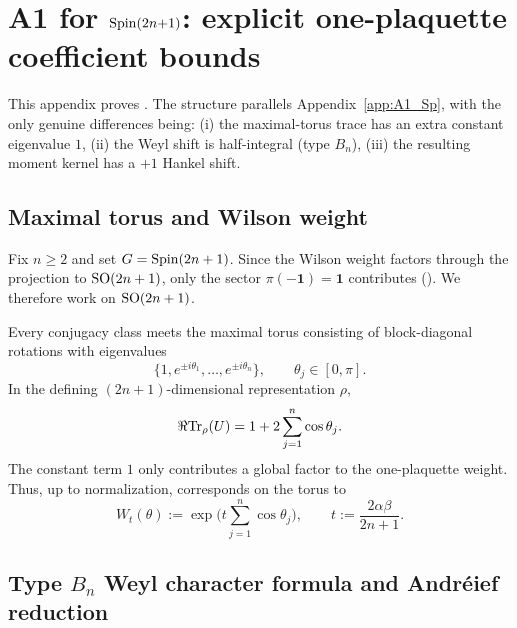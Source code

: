 \section{A1 for \texorpdfstring{$\mathrm{Spin}(2n{+}1)$}{Spin(2n+1)}: explicit one-plaquette coefficient bounds}
\label{app:A1_Spin_odd}

This appendix proves .
The structure parallels Appendix~\ref{app:A1_Sp}, with the only genuine differences being:
(i) the maximal-torus trace has an extra constant eigenvalue $1$,
(ii) the Weyl shift is half-integral (type $B_n$),
(iii) the resulting moment kernel has a $+1$ Hankel shift.

\subsection{Maximal torus and Wilson weight}
\label{subsec:A1_Spin_odd_setup}

Fix $n\ge 2$ and set $G=\mathrm{Spin}(2n+1)$.
Since the Wilson weight factors through the projection to $\mathrm{SO}(2n+1)$, only the sector $\pi(-\mathbf 1)=\mathbf 1$ contributes
().
We therefore work on $\mathrm{SO}(2n+1)$.

Every conjugacy class meets the maximal torus consisting of block-diagonal rotations
with eigenvalues
\begin{equation}
\label{eq:SO_odd_eigs}
\{1,e^{\pm i\theta_1},\dots,e^{\pm i\theta_n}\},\qquad \theta_j\in[0,\pi].
\end{equation}
In the defining $(2n+1)$-dimensional representation $\rho$,
\begin{equation}
\label{eq:SO_odd_trace}
\Re\mathrm{Tr}_{\rho}(U)=1+2\sum_{j=1}^n \cos\theta_j.
\end{equation}
The constant term $1$ only contributes a global factor to the one-plaquette weight.
Thus, up to normalization,
 corresponds on the torus to
\begin{equation}
\label{eq:SO_odd_symbol}
W_t(\theta):=\exp\Big(t\sum_{j=1}^n \cos\theta_j\Big),
\qquad t:=\frac{2\alpha\beta}{2n+1}.
\end{equation}

\subsection{Type \texorpdfstring{$B_n$}{B\_n} Weyl character formula and Andr\'eief reduction}
\label{subsec:A1_Spin_odd_determinant}

